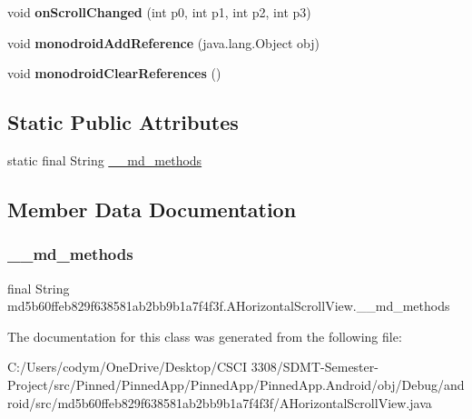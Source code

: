 \begin{DoxyCompactItemize}
void {\bfseries on\+Scroll\+Changed} (int p0, int p1, int p2, int p3)
\item 
\mbox{\label{classmd5b60ffeb829f638581ab2bb9b1a7f4f3f_1_1_a_horizontal_scroll_view_ab9c83144693d24a7290a699e37f9d99d}} 
void {\bfseries monodroid\+Add\+Reference} (java.\+lang.\+Object obj)
\item 
\mbox{\label{classmd5b60ffeb829f638581ab2bb9b1a7f4f3f_1_1_a_horizontal_scroll_view_ad7c4b2bdd6ed74674575ab60c82d8e0c}} 
void {\bfseries monodroid\+Clear\+References} ()
\end{DoxyCompactItemize}
\subsection*{Static Public Attributes}
\begin{DoxyCompactItemize}
\item 
static final String \hyperlink{classmd5b60ffeb829f638581ab2bb9b1a7f4f3f_1_1_a_horizontal_scroll_view_a49c664fbcff063e605248e4205b9125b}{\+\_\+\+\_\+md\+\_\+methods}
\end{DoxyCompactItemize}


\subsection{Member Data Documentation}
\mbox{\label{classmd5b60ffeb829f638581ab2bb9b1a7f4f3f_1_1_a_horizontal_scroll_view_a49c664fbcff063e605248e4205b9125b}} 
\subsubsection{\texorpdfstring{\+\_\+\+\_\+md\+\_\+methods}{\_\_md\_methods}}
{\footnotesize\ttfamily final String md5b60ffeb829f638581ab2bb9b1a7f4f3f.\+A\+Horizontal\+Scroll\+View.\+\_\+\+\_\+md\+\_\+methods\hspace{0.3cm}{\ttfamily [static]}}



The documentation for this class was generated from the following file\+:\begin{DoxyCompactItemize}
\item 
C\+:/\+Users/codym/\+One\+Drive/\+Desktop/\+C\+S\+C\+I 3308/\+S\+D\+M\+T-\/\+Semester-\/\+Project/src/\+Pinned/\+Pinned\+App/\+Pinned\+App/\+Pinned\+App.\+Android/obj/\+Debug/android/src/md5b60ffeb829f638581ab2bb9b1a7f4f3f/A\+Horizontal\+Scroll\+View.\+java\end{DoxyCompactItemize}
